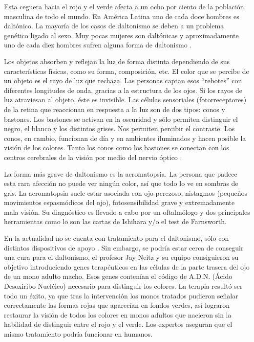 \documentclass[10pt]{article}
\begin{document}
\setlength{\parskip}{2mm}

Esta ceguera hacia el rojo y el verde afecta a un ocho por ciento de la población masculina de todo el mundo. En América Latina uno de cada doce hombres es daltónico. La mayoría de los casos de daltonismo se deben a un problema genético ligado al sexo. Muy pocas mujeres son daltónicas y aproximadamente uno de cada diez hombres sufren alguna forma de daltonismo \cite{IEEEreferencias:Ref3}.


\setlength{\parskip}{2mm}

Los objetos absorben y reflejan la luz de forma distinta dependiendo de sus características físicas, como su forma, composición, etc. El color que se percibe de un objeto es el rayo de luz que rechaza. Las personas captan esos “rebotes” con diferentes longitudes de onda, gracias a la estructura de los ojos. Si los rayos de luz atraviesan al objeto, éste es invisible. Las células sensoriales (fotorreceptores) de la retina que reaccionan en respuesta a la luz son de dos tipos: conos y bastones. Los bastones se activan en la oscuridad y sólo permiten distinguir el negro, el blanco y los distintos grises. Nos permiten percibir el contraste. Los conos, en cambio, funcionan de día y en ambientes iluminados y hacen posible la visión de los colores. Tanto los conos como los bastones se conectan con los centros cerebrales de la visión por medio del nervio óptico \cite{IEEEreferencias:Ref3}.


\setlength{\parskip}{2mm}

La forma más grave de daltonismo es la acromatopsia. La persona que padece esta rara afección no puede ver ningún color, así que todo lo ve en sombras de gris. La acromatopsia suele estar asociada con ojo perezoso, nistagmos (pequeños movimientos espasmódicos del ojo), fotosensibilidad grave y extremadamente mala visión. Su diagnóstico es llevado a cabo por un oftalmólogo y dos principales herramientas como lo son las cartas de Ishihara y/o el test de Farnsworth\cite{IEEEreferencias:Ref3}.

\setlength{\parskip}{2mm}

En la actualidad no se cuenta con tratamiento para el daltonismo, sólo con distintos dispositivos de apoyo \cite{IEEEreferencias:Ref1}. Sin embargo, se podría estar cerca de conseguir una cura para el daltonismo, el profesor Jay Neitz y su equipo consiguieron su objetivo introduciendo genes terapéuticos en las células de la parte trasera del ojo de un mono adulto macho. Esos genes contenían el código de A.D.N. (Ácido Desoxiribo Nucléico) necesario para distinguir los colores. La terapia resultó ser todo un éxito, ya que tras la intervención los monos tratados pudieron señalar correctamente las formas rojas que aparecían en fondos verdes, así lograron restaurar la visión de todos los colores en monos adultos que nacieron sin la habilidad de distinguir entre el rojo y el verde. Los expertos aseguran que el mismo tratamiento podría funcionar en humanos\cite{IEEEreferencias:Ref4}.
\newpage
\end{document}
